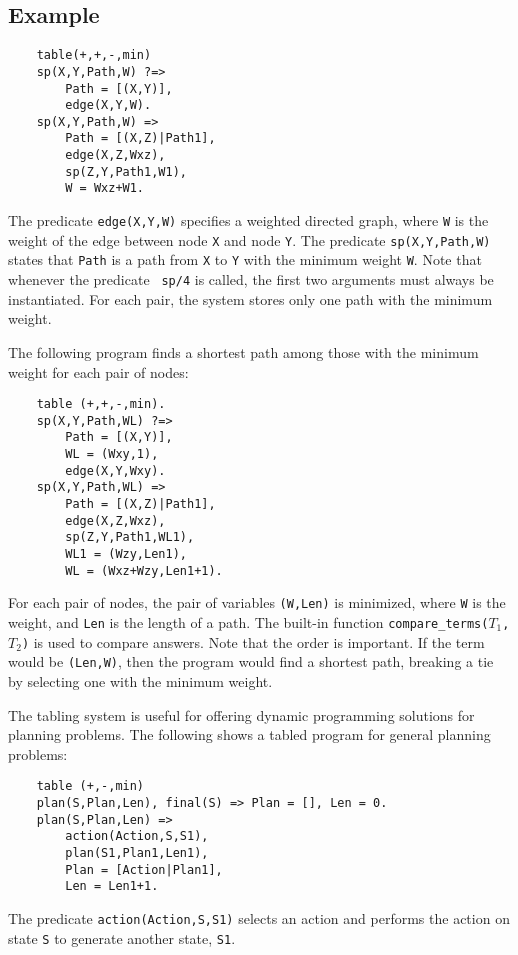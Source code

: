 \subsection*{Example}
\begin{verbatim}
    table(+,+,-,min)
    sp(X,Y,Path,W) ?=>
        Path = [(X,Y)],
        edge(X,Y,W).
    sp(X,Y,Path,W) =>
        Path = [(X,Z)|Path1],
        edge(X,Z,Wxz),
        sp(Z,Y,Path1,W1),
        W = Wxz+W1.
\end{verbatim}
The predicate \texttt{edge(X,Y,W)} specifies a weighted directed graph, where \texttt{W} is the weight of the edge between node \texttt{X} and node \texttt{Y}. The predicate \texttt{sp(X,Y,Path,W)} states that \texttt{Path} is a path from \texttt{X} to \texttt{Y} with the minimum weight \texttt{W}. Note that whenever the predicate \texttt{ sp/4} is called, the first two arguments must always be instantiated. For each pair, the system stores only one path with the minimum weight. 

The following program finds a shortest path among those with the minimum weight for each pair of nodes:
\begin{verbatim}
    table (+,+,-,min).
    sp(X,Y,Path,WL) ?=>
        Path = [(X,Y)],
        WL = (Wxy,1),
        edge(X,Y,Wxy).
    sp(X,Y,Path,WL) =>
        Path = [(X,Z)|Path1],
        edge(X,Z,Wxz),
        sp(Z,Y,Path1,WL1),
        WL1 = (Wzy,Len1),
        WL = (Wxz+Wzy,Len1+1).
\end{verbatim}
For each pair of nodes, the pair of variables \texttt{(W,Len)} is minimized, where \texttt{W} is the weight, and \texttt{Len} is the length of a path. The built-in function \texttt{compare\_terms($T_1$,$T_2$)} is used to compare answers. Note that the order is important. If the term would be \texttt{(Len,W)}, then the program would find a shortest path, breaking a tie by selecting one with the minimum weight.

The tabling system is useful for offering dynamic programming solutions for planning problems. The following shows a tabled program for general planning problems:
\begin{verbatim}
    table (+,-,min)
    plan(S,Plan,Len), final(S) => Plan = [], Len = 0.
    plan(S,Plan,Len) =>
        action(Action,S,S1),
        plan(S1,Plan1,Len1),
        Plan = [Action|Plan1],
        Len = Len1+1.
\end{verbatim}
The predicate \texttt{action(Action,S,S1)} selects an action and performs the action on state \texttt{S} to generate another state, \texttt{S1}.

